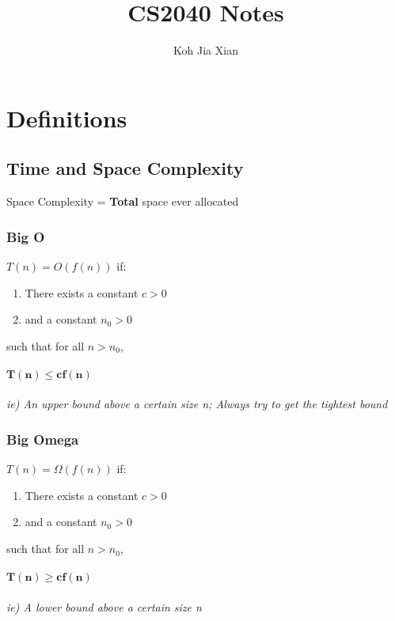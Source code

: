 \documentclass{article}
\title{CS2040 Notes}
\author{Koh Jia Xian}
\begin{document}
    \maketitle
    \tableofcontents

    \pagebreak

    \section{Definitions}

    \subsection{Time and Space Complexity}

    Space Complexity = \textbf{Total} space ever allocated

    \subsubsection{Big O}

    $T(n) = O(f(n))$ if:
    \begin{enumerate}
        \item There exists a constant $c > 0$
        \item and a constant $n_{0} > 0$
    \end{enumerate}
    such that for all $n > n_{0}$, \\\\$\bm{T(n) \leq c f(n)}$\\\\
    \emph{ie) An upper bound above a certain size n; Always try to get the tightest bound}

    \subsubsection{Big Omega}

    $T(n) = \Omega(f(n))$ if:
    \begin{enumerate}
        \item There exists a constant $c > 0$
        \item and a constant $n_{0} > 0$
    \end{enumerate}
    such that for all $n > n_{0}$, \\\\$\bm{T(n) \geq c f(n)}$\\\\
    \emph{ie) A lower bound above a certain size n}
\end{document}
